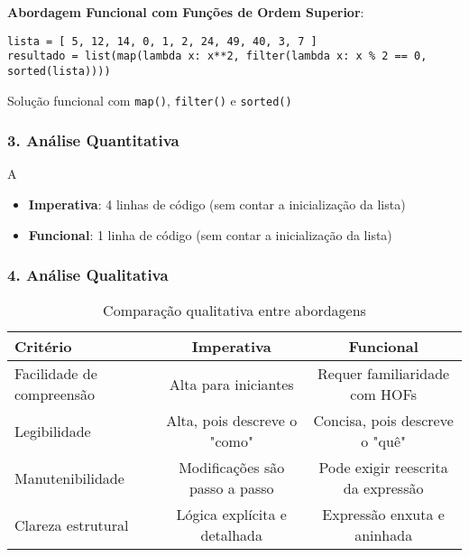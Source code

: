 \textbf{Abordagem Funcional com Funções de Ordem Superior}:

\begin{listing}[!ht]
\begin{verbatim}
lista = [ 5, 12, 14, 0, 1, 2, 24, 49, 40, 3, 7 ]
resultado = list(map(lambda x: x**2, filter(lambda x: x % 2 == 0, sorted(lista))))
\end{verbatim}
\caption{Solução funcional com \texttt{map()}, \texttt{filter()} e \texttt{sorted()}}
\label{listing:hof_funcional}
\end{listing}

\subsubsection*{3. Análise Quantitativa}
A
\begin{itemize}
    \item \textbf{Imperativa}: 4 linhas de código (sem contar a inicialização da lista)
    \item \textbf{Funcional}: 1 linha de código (sem contar a inicialização da lista)
\end{itemize}

\subsubsection*{4. Análise Qualitativa}

\begin{table}[H]
    \centering
    \caption{Comparação qualitativa entre abordagens}
    \begin{tabular}{|l|c|c|}
        \hline
        \textbf{Critério} & \textbf{Imperativa} & \textbf{Funcional} \\
        \hline
        Facilidade de compreensão & Alta para iniciantes & Requer familiaridade com HOFs \\
        \hline
        Legibilidade & Alta, pois descreve o "como" & Concisa, pois descreve o "quê" \\
        \hline
        Manutenibilidade & Modificações são passo a passo & Pode exigir reescrita da expressão \\
        \hline
        Clareza estrutural & Lógica explícita e detalhada & Expressão enxuta e aninhada \\
        \hline
    \end{tabular}
\end{table}